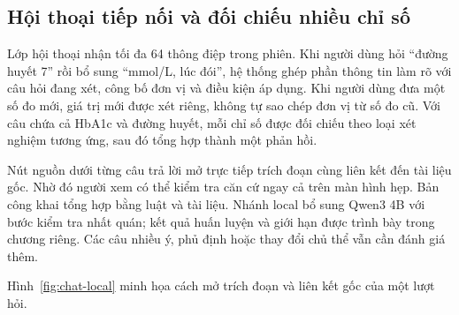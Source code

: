 \subsection{Hội thoại tiếp nối và đối chiếu nhiều chỉ số}
Lớp hội thoại nhận tối đa 64 thông điệp trong phiên. Khi người dùng hỏi ``đường huyết 7'' rồi bổ sung ``mmol/L, lúc đói'', hệ thống ghép phần thông tin làm rõ với câu hỏi đang xét, công bố đơn vị và điều kiện áp dụng. Khi người dùng đưa một số đo mới, giá trị mới được xét riêng, không tự sao chép đơn vị từ số đo cũ. Với câu chứa cả HbA1c và đường huyết, mỗi chỉ số được đối chiếu theo loại xét nghiệm tương ứng, sau đó tổng hợp thành một phản hồi.

Nút nguồn dưới từng câu trả lời mở trực tiếp trích đoạn cùng liên kết đến tài liệu gốc. Nhờ đó người xem có thể kiểm tra căn cứ ngay cả trên màn hình hẹp. Bản công khai tổng hợp bằng luật và tài liệu. Nhánh local bổ sung Qwen3 4B với bước kiểm tra nhất quán; kết quả huấn luyện và giới hạn được trình bày trong chương riêng. Các câu nhiều ý, phủ định hoặc thay đổi chủ thể vẫn cần đánh giá thêm.

Hình~\ref{fig:chat-local} minh họa cách mở trích đoạn và liên kết gốc của một lượt hỏi.
